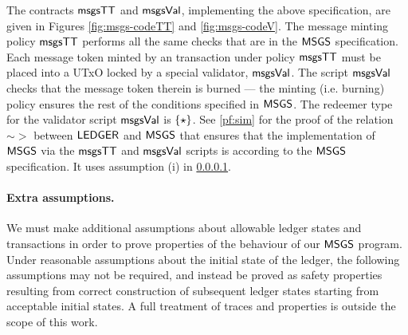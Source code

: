 The contracts $\mathsf{msgsTT}$ and $\mathsf{msgsVal}$, implementing the above specification,
are given in Figures \ref{fig:msgs-codeTT}
and \ref{fig:msgs-codeV}. The message minting policy $\mathsf{msgsTT}$ performs all the same
checks that are in the $\mathsf{MSGS}$ specification. Each message token minted by
an transaction under policy $\mathsf{msgsTT}$ must be placed
into a UTxO locked by a special validator, $\mathsf{msgsVal}$.
The script $\mathsf{msgsVal}$ checks that the message token therein is burned --- the minting
(i.e. burning) policy ensures the rest of the conditions specified in $\mathsf{MSGS}$.
The redeemer type for the validator script $\mathsf{msgsVal}$ is $\{\star\}$.
See \ref{pf:sim} for the proof of the relation $\sim >$ between $\mathsf{LEDGER}$
and $\mathsf{MSGS}$ that ensures that the implementation of $\mathsf{MSGS}$ via the $\mathsf{msgsTT}$
and $\mathsf{msgsVal}$ scripts is according to the $\mathsf{MSGS}$ specification. It uses
assumption (i) in \ref{sec:assmp}.


\paragraph{Extra assumptions. }
\label{sec:assmp}
We must make additional assumptions about allowable ledger states and transactions
in order to prove properties of the behaviour of our $\mathsf{MSGS}$ program.
Under reasonable assumptions about the initial state of the ledger, the following
assumptions may not be required, and instead be proved as
safety properties \cite{liveness} resulting from correct construction of subsequent
ledger states starting from acceptable initial states. A full treatment of
traces and properties is outside the scope of this work.

